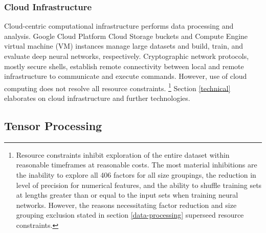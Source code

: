 \documentclass[12pt]{article}
\begin{document}
\subsubsection{Cloud Infrastructure}
Cloud-centric computational infrastructure performs data processing and analysis.
Google Cloud Platform Cloud Storage buckets and Compute Engine virtual machine (VM) instances manage large datasets and build, train, and evaluate deep neural networks, respectively.
Cryptographic network protocols, mostly secure shells, establish remote connectivity between local and remote infrastructure to communicate and execute commands.
However, use of cloud computing does not resolve all resource constraints.
\footnote{Resource constraints inhibit exploration of the entire dataset within reasonable timeframes at reasonable costs.
	The most material inhibitions are the inability to explore all 406 factors for all size groupings, the reduction in level of precision for numerical features, and
	the ability to shuffle training sets at lengths greater than or equal to the input sets when training neural networks.
	However, the reasons necessitating factor reduction and size grouping exclusion stated in section \ref{data-processing} superseed resource constraints.}
Section \ref{technical} elaborates on cloud infrastructure and further technologies.

\subsection{Tensor Processing}
\end{document}
